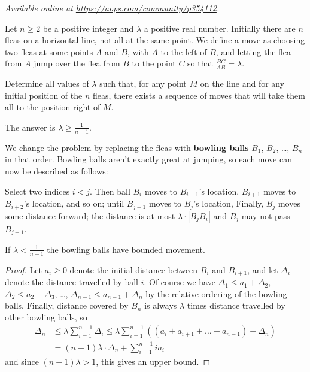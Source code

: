 \textsl{Available online at \url{https://aops.com/community/p354112}.}
\begin{mdframed}[style=mdpurplebox,frametitle={Problem statement}]
Let $n \ge 2$ be a positive integer
and $\lambda$ a positive real number.
Initially there are $n$ fleas on a horizontal line,
not all at the same point.
We define a move as choosing two fleas at some points $A$ and $B$,
with $A$ to the left of $B$,
and letting the flea from $A$ jump over the flea from $B$ to the point $C$
so that $\frac{BC}{AB} = \lambda$.

Determine all values of $ \lambda$ such that,
for any point $M$ on the line
and for any initial position of the $n$ fleas,
there exists a sequence of moves that will take
them all to the position right of $M$.
\end{mdframed}
The answer is $\lambda \ge \frac{1}{n-1}$.

We change the problem by replacing the fleas
with \textbf{bowling balls} $B_1$, $B_2$, \dots, $B_n$ in that order.
Bowling balls aren't exactly great at jumping,
so each move can now be described as follows:
\begin{itemize}
\ii Select two indices $i < j$.
Then ball $B_i$ moves to $B_{i+1}$'s location,
$B_{i+1}$ moves to $B_{i+2}$'s location, and so on;
until $B_{j-1}$ moves to $B_j$'s location,
\ii Finally, $B_j$ moves some distance forward;
the distance is at most $\lambda \cdot |B_j B_i|$
and $B_j$ may not pass $B_{j+1}$.
\end{itemize}

\begin{claim*}
  If $\lambda < \frac{1}{n-1}$
  the bowling balls have bounded movement.
\end{claim*}
\begin{proof}
  Let $a_i \ge 0$ denote the initial distance
  between $B_i$ and $B_{i+1}$,
  and let $\Delta_i$ denote the distance travelled by ball $i$.
  Of course we have
  $\Delta_1 \le a_1 + \Delta_2$,
  $\Delta_2 \le a_2 + \Delta_3$,
  \dots,
  $\Delta_{n-1} \le a_{n-1} + \Delta_n$
  by the relative ordering of the bowling balls.
  Finally, distance covered by $B_n$ is always
  $\lambda$ times distance travelled by other bowling balls, so
  \begin{align*}
    \Delta_n &\le \lambda \sum_{i=1}^{n-1} \Delta_i
    \le \lambda \sum_{i=1}^{n-1}
    \left( \left( a_i + a_{i+1} + \dots + a_{n-1} \right)
      + \Delta_n \right) \\
    &= (n-1)\lambda \cdot \Delta_n + \sum_{i=1}^{n-1} i a_i
  \end{align*}
  and since $(n-1)\lambda > 1$, this gives an upper bound.
\end{proof}

